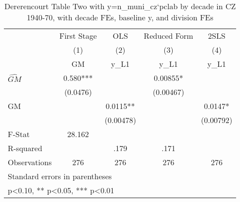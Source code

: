 \begin{table}[htbp]\centering
\def\sym#1{\ifmmode^{#1}\else\(^{#1}\)\fi}
\caption{Dererencourt Table Two with y=n\_muni\_cz`pclab by decade in CZ 1940-70, with decade FEs, baseline y, and division FEs}
\begin{tabular}{l*{4}{c}}
\toprule
                    & First Stage   &         OLS   &Reduced Form   &        2SLS   \\
                    &\multicolumn{1}{c}{(1)}&\multicolumn{1}{c}{(2)}&\multicolumn{1}{c}{(3)}&\multicolumn{1}{c}{(4)}\\
                    &\multicolumn{1}{c}{GM}&\multicolumn{1}{c}{y\_L1}&\multicolumn{1}{c}{y\_L1}&\multicolumn{1}{c}{y\_L1}\\
\midrule
$\hat{GM}$          &       0.580***&               &     0.00855*  &               \\
                    &    (0.0476)   &               &   (0.00467)   &               \\
\addlinespace
GM                  &               &      0.0115** &               &      0.0147*  \\
                    &               &   (0.00478)   &               &   (0.00792)   \\
\midrule
F-Stat              &      28.162   &               &               &               \\
R-squared           &               &        .179   &        .171   &               \\
Observations        &         276   &         276   &         276   &         276   \\
\bottomrule
\multicolumn{5}{l}{\footnotesize Standard errors in parentheses}\\
\multicolumn{5}{l}{\footnotesize * p<0.10, ** p<0.05, *** p<0.01}\\
\end{tabular}
\end{table}
